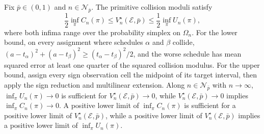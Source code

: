 Fix \(\bar p\in(0,1)\) and \(n\in\mathcal N_{\bar p}\). The primitive collision moduli satisfy
\[
 \frac12\inf_{\pi}C_n(\pi)
 \le V_n^\star(\mathcal E,\bar p)
 \le\frac12\inf_{\pi}U_n(\pi),
\]
where both infima range over the probability simplex on \(\Omega_n\). For the lower bound, on every assignment where schedules \(\alpha\) and \(\beta\) collide, \((a-t_\alpha)^2+(a-t_\beta)^2\ge(t_\alpha-t_\beta)^2/2\), and the worse schedule has mean squared error at least one quarter of the squared collision modulus. For the upper bound, assign every sign observation cell the midpoint of its target interval, then apply the sign reduction and multilinear extension. Along \(n\in\mathcal N_{\bar p}\) with \(n\to\infty\), \(\inf_\pi U_n(\pi)\to0\) is sufficient for \(V_n^\star(\mathcal E,\bar p)\to0\), while \(V_n^\star(\mathcal E,\bar p)\to0\) implies \(\inf_\pi C_n(\pi)\to0\). A positive lower limit of \(\inf_\pi C_n(\pi)\) is sufficient for a positive lower limit of \(V_n^\star(\mathcal E,\bar p)\), while a positive lower limit of \(V_n^\star(\mathcal E,\bar p)\) implies a positive lower limit of \(\inf_\pi U_n(\pi)\).